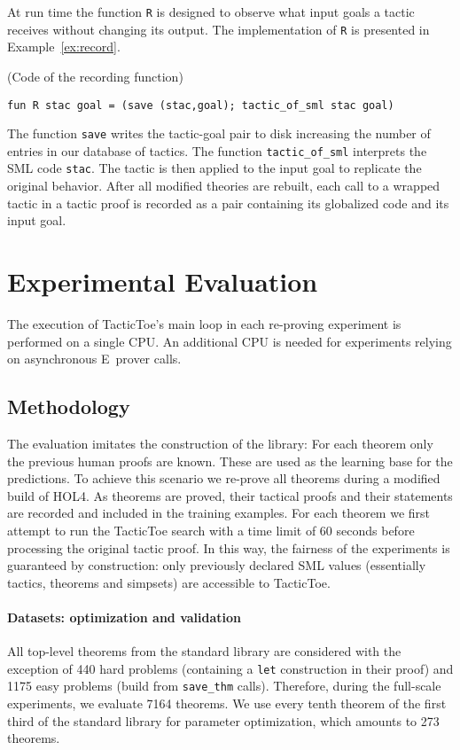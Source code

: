 \documentclass[runningheads,a4paper,draft]{svjour3}
\def\holfour{\textsf{HOL4}\xspace}
\def\eprover{\textsf{E~prover}\xspace}
\def\sml{\textsf{SML}\xspace}
\def\tactictoe{\textsf{TacticToe}\xspace}
\begin{document}
At run time the function \texttt{R} is designed to observe what input goals a
tactic  receives without changing its output. The implementation of \texttt{R}
is presented in Example~\ref{ex:record}.

\begin{example}\label{ex:record} (Code of the recording function)
\begin{lstlisting}[language=SMLSmall]
fun R stac goal = (save (stac,goal); tactic_of_sml stac goal)
\end{lstlisting}
\end{example}

The function \texttt{save} writes the tactic-goal pair to disk increasing the
number of entries in our database of tactics. The function
\texttt{tactic\_of\_sml} interprets the \sml code \texttt{stac}. The tactic is
then applied to the input goal to replicate the original behavior.
After all modified theories are rebuilt, each call to a wrapped tactic in a
tactic proof is recorded as a pair containing its globalized code and its
input goal.


\section{Experimental Evaluation}\label{s:experiments}
The execution of \tactictoe's main loop in each re-proving experiment is
performed on a single CPU. An additional CPU is needed for experiments relying
on asynchronous \eprover calls.


\subsection{Methodology}
The evaluation imitates the construction of the library: For each theorem only
the previous human proofs are known. These are used as the learning base for
the predictions.
To achieve this scenario we re-prove all theorems during a modified build of
\holfour.
As theorems are proved, their tactical proofs and their statements are
recorded and included in the training examples.
For each theorem we first attempt to run the \tactictoe search with a time
limit of 60 seconds before processing the original tactic proof.
In this way, the fairness of the experiments is guaranteed by construction:
only previously declared \sml values (essentially tactics, theorems and
simpsets) are accessible to \tactictoe.

\paragraph{Datasets: optimization and validation}
All top-level theorems from the standard library are considered with the
exception of 440 hard problems (containing a \texttt{let} construction in their
proof) and 1175 easy problems (build from \texttt{save\_thm} calls).
Therefore, during the full-scale experiments, we evaluate 7164 theorems.
We use every tenth theorem of the first third of the standard library for
parameter optimization, which amounts to 273 theorems.
\end{document}
